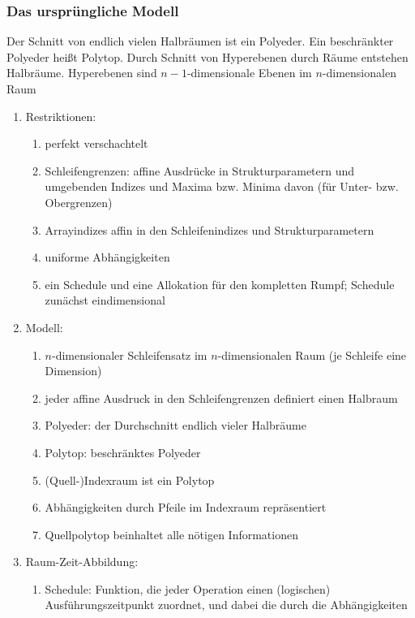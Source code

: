 \subsubsection{Das ursprüngliche Modell}
\label{sec:orig-mod}

Der Schnitt von endlich vielen Halbräumen ist ein Polyeder.
Ein beschränkter Polyeder heißt Polytop.
Durch Schnitt von Hyperebenen durch Räume entstehen Halbräume.
Hyperebenen sind $n-1$-dimensionale Ebenen im $n$-dimensionalen Raum

\begin{enumerate}
\item Restriktionen:
\begin{enumerate}
\item perfekt verschachtelt
\item Schleifengrenzen: affine Ausdrücke in Strukturparametern und umgebenden
  Indizes und Maxima bzw. Minima davon (für Unter- bzw. Obergrenzen)
\item Arrayindizes affin in den Schleifenindizes und Strukturparametern
\item uniforme Abhängigkeiten
\item ein Schedule und eine Allokation für den kompletten Rumpf;
  Schedule zunächst eindimensional
\end{enumerate}
%
\item Modell:
\begin{enumerate}
\item $n$-dimensionaler Schleifensatz im $n$-dimensionalen Raum (je
  Schleife eine Dimension)
\item jeder affine Ausdruck in den Schleifengrenzen definiert einen
  Halbraum
\item Polyeder: der Durchschnitt endlich vieler Halbräume
\item Polytop: beschränktes Polyeder
\item (Quell-)Indexraum ist ein Polytop
\item Abhängigkeiten durch Pfeile im Indexraum repräsentiert
\item Quellpolytop beinhaltet alle nötigen Informationen
\end{enumerate}
%
\item Raum-Zeit-Abbildung:
\begin{enumerate}
\item Schedule: Funktion, die jeder Operation einen (logischen)
  Ausführungszeitpunkt zuordnet, und dabei die durch die Abhängigkeiten

\end{enumerate}
\end{enumerate}
